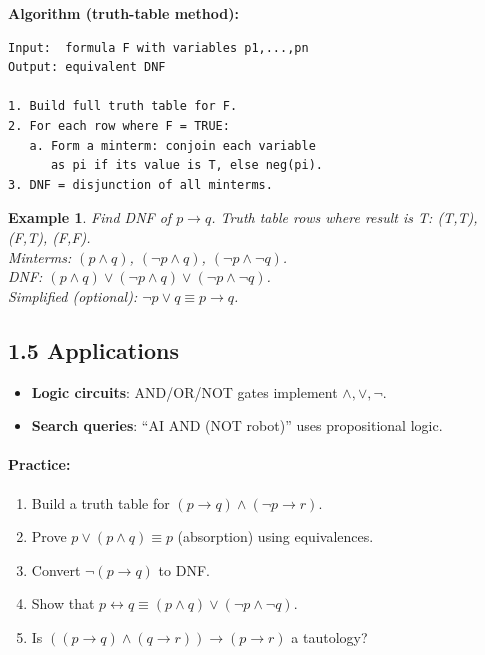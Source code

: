 \documentclass[11pt]{article}
\newtheorem{example}[definition]{Example}
\newenvironment{practice}{\paragraph*{\textbf{Practice:}}}{}
\newcommand{\lra}{\leftrightarrow}
\newcommand{\ra}{\rightarrow}
\begin{document}
\textbf{Algorithm (truth-table method):}
\begin{lstlisting}[caption={DNF conversion algorithm}]
Input:  formula F with variables p1,...,pn
Output: equivalent DNF

1. Build full truth table for F.
2. For each row where F = TRUE:
   a. Form a minterm: conjoin each variable
      as pi if its value is T, else neg(pi).
3. DNF = disjunction of all minterms.
\end{lstlisting}

\begin{example}
Find DNF of $p\ra q$.
Truth table rows where result is T: (T,T), (F,T), (F,F).\\
Minterms: $(p\land q)$, $(\neg p\land q)$, $(\neg p\land\neg q)$.\\
DNF: $(p\land q)\lor(\neg p\land q)\lor(\neg p\land\neg q)$.\\
Simplified (optional): $\neg p\lor q\equiv p\ra q$. \checkmark
\end{example}

\subsection*{1.5 Applications}

\begin{itemize}[nosep]
  \item \textbf{Logic circuits}: AND/OR/NOT gates implement $\land,\lor,\neg$.
  \item \textbf{Search queries}: ``AI AND (NOT robot)'' uses propositional logic.
\end{itemize}

\begin{practice}
\begin{enumerate}[nosep,label=\arabic*.]
  \item Build a truth table for $(p\ra q)\land(\neg p\ra r)$.
  \item Prove $p\lor(p\land q)\equiv p$ (absorption) using equivalences.
  \item Convert $\neg(p\ra q)$ to DNF.
  \item Show that $p\lra q\equiv(p\land q)\lor(\neg p\land\neg q)$.
  \item Is $((p\ra q)\land(q\ra r))\ra(p\ra r)$ a tautology?
\end{enumerate}
\end{practice}

\newpage
\end{document}
